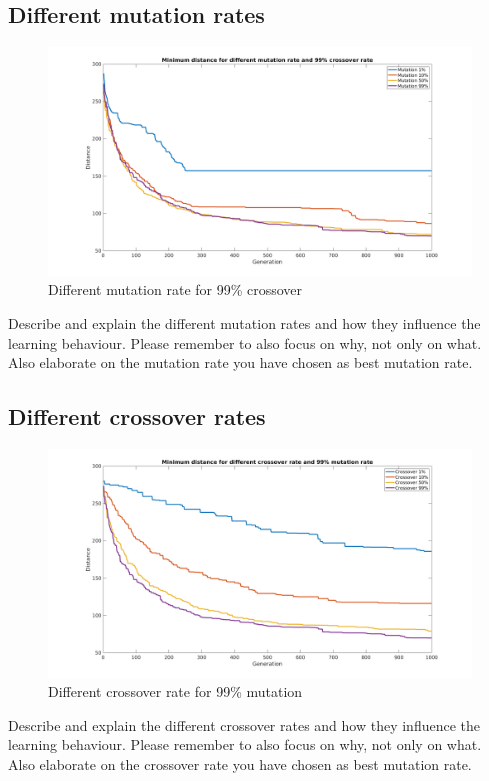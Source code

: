 \documentclass[a4paper, 12pt]{article}
\begin{document}
\subsection{Different mutation rates}

\begin{figure}[ht!]
	\centering
	\includegraphics[width=1.1\textwidth]{images/crossfig-mine}
	\caption{Different mutation rate for 99\% crossover \label{fig:crossfig}}
\end{figure}

Describe and explain the different mutation rates and how they influence the learning behaviour. Please remember to also focus on why, not only on what.
Also elaborate on the mutation rate you have chosen as best mutation rate.

\subsection{Different crossover rates}


\begin{figure}[ht!]
  \centering
  \includegraphics[width=1.0\textwidth]{images/mutfig-mine}
    \caption{Different crossover rate for 99\% mutation \label{fig:mutfig}}
\end{figure}

Describe and explain the different crossover rates and how they influence the learning behaviour. Please remember to also focus on why, not only on what.
Also elaborate on the crossover rate you have chosen as best mutation rate.
\end{document}
